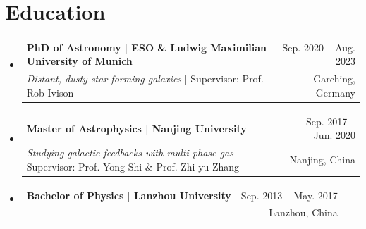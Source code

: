 \documentclass[A4,11pt]{article}
\makeatletter
\newcommand{\CVSubheading}[4]{
  \vspace{-2pt}\item
    \begin{tabular*}{0.97\textwidth}[t]{l@{\extracolsep{\fill}}r}
      \textbf{#1} & #2 \\
      \small#3 & \small #4 \\
    \end{tabular*}\vspace{-7pt}
}
\newcommand{\CVSubHeadingListStart}{\begin{itemize}[leftmargin=0.5cm, label={}]}
\newcommand{\CVSubHeadingListEnd}{\end{itemize}}
\makeatother
\begin{document}

\section{Education}
  \CVSubHeadingListStart
    \CVSubheading
    {{PhD of Astronomy $|$ {\small{ESO \& Ludwig Maximilian University of Munich}}}}{Sep. 2020 -- Aug. 2023}
     {\emph{Distant, dusty star-forming galaxies} $|$ Supervisor: Prof. Rob Ivison}{Garching, Germany}
    \CVSubheading
      {{Master of Astrophysics $|$ {\small{Nanjing University}}}}{Sep. 2017 -- Jun. 2020}
      {\emph{Studying galactic feedbacks with multi-phase gas} $|$ Supervisor: Prof. Yong Shi \& Prof. Zhi-yu Zhang}{Nanjing, China}
    \CVSubheading
      {{Bachelor of Physics $|$ {\small{Lanzhou University}}}}{Sep. 2013 -- May. 2017}
      {\emph{}}{Lanzhou, China}
  \CVSubHeadingListEnd
\end{document}
